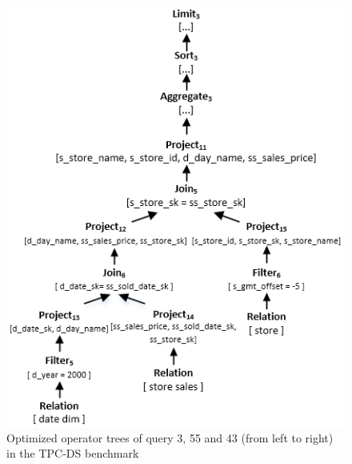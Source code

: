 \begin{figure}[htbp]
	\includegraphics[scale=0.5]{figures/q43}
	\caption{Optimized operator trees of query 3, 55 and 43 (from left to right) in the TPC-DS benchmark} 
	\label{fig:queries}
\end{figure}